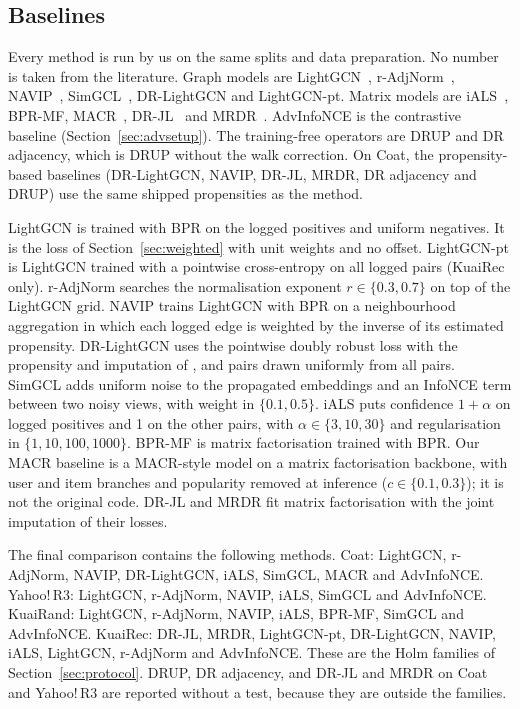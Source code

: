 \subsection{Baselines}\label{sec:baselines}

Every method is run by us on the same splits and data preparation. No number is taken from the
literature. Graph models are LightGCN~\citep{he2020lightgcn}, r-AdjNorm~\citep{zhao2022radjnorm},
NAVIP~\citep{kim2022navip}, SimGCL~\citep{yu2022simgcl}, DR-LightGCN and LightGCN-pt. Matrix models
are iALS~\citep{hu2008ials,rendle2022ials}, BPR-MF, MACR~\citep{wei2021macr}, DR-JL~\citep{wang2019drjl} and
MRDR~\citep{guo2021mrdr}. AdvInfoNCE is the contrastive baseline (Section~\ref{sec:advsetup}).
The training-free operators are DRUP and DR adjacency, which is DRUP without the walk correction.
On Coat, the propensity-based baselines (DR-LightGCN, NAVIP, DR-JL, MRDR, DR adjacency and DRUP) use the
same shipped propensities as the method.

LightGCN is trained with BPR on the logged positives and uniform negatives. It is the loss of
Section~\ref{sec:weighted} with unit weights and no offset. LightGCN-pt is LightGCN trained with a
pointwise cross-entropy on all logged pairs (KuaiRec only). r-AdjNorm searches the normalisation
exponent $r\in\{0.3,0.7\}$ on top of the LightGCN grid. NAVIP trains LightGCN with BPR on a
neighbourhood aggregation in which each logged edge is weighted by the inverse of its estimated
propensity. DR-LightGCN uses the pointwise doubly robust loss with the propensity and imputation of
\qp, and pairs drawn uniformly from all pairs. SimGCL adds uniform noise to the propagated
embeddings and an InfoNCE term between two noisy views, with weight in $\{0.1,0.5\}$. iALS puts
confidence $1+\alpha$ on logged positives and 1 on the other pairs, with $\alpha\in\{3,10,30\}$ and
regularisation in $\{1,10,100,1000\}$. BPR-MF is matrix factorisation trained with BPR. Our MACR
baseline is a MACR-style model on a matrix factorisation backbone, with user and item branches and
popularity removed at inference ($c\in\{0.1,0.3\}$); it is not the original code. DR-JL and MRDR fit
matrix factorisation with the joint imputation of their losses.

The final comparison contains the following methods. Coat: LightGCN, r-AdjNorm, NAVIP, DR-LightGCN,
iALS, SimGCL, MACR and AdvInfoNCE. Yahoo!\,R3: LightGCN, r-AdjNorm, NAVIP, iALS, SimGCL and
AdvInfoNCE. KuaiRand: LightGCN, r-AdjNorm, NAVIP, iALS, BPR-MF, SimGCL and AdvInfoNCE. KuaiRec:
DR-JL, MRDR, LightGCN-pt, DR-LightGCN, NAVIP, iALS, LightGCN, r-AdjNorm and AdvInfoNCE. These are
the Holm families of Section~\ref{sec:protocol}. DRUP, DR adjacency, and DR-JL and MRDR on Coat and
Yahoo!\,R3 are reported without a test, because they are outside the families.

